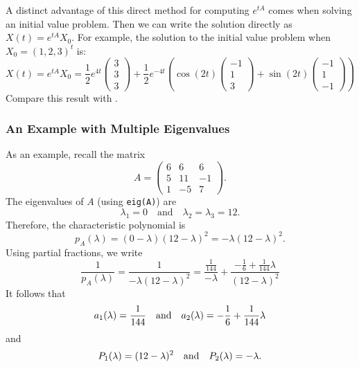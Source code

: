 \documentclass{ximera}
\begin{document}
A distinct advantage of this direct method for computing $e^{tA}$ comes
when solving an initial value problem.  Then we can write the solution 
directly as $X(t)=e^{tA}X_0$.  For example, the solution to the initial
value problem when $X_0=(1,2,3)^t$ is:
\[
X(t) = e^{tA}X_0 = \frac{1}{2}e^{4t}
\left(\begin{array}{c} 3\\3\\3\end{array}\right)
+ \frac{1}{2}e^{-4t}\left(\cos(2t)\left(\begin{array}{r}
-1\\1\\3\end{array}\right)+\sin(2t)
\left(\begin{array}{r} -1\\1\\-1 \end{array}\right)\right) 
\]
Compare this result with .


\subsubsection*{An Example with Multiple Eigenvalues}

As an example, recall the matrix 
\[
A =
\left(\begin{array}{rrr}
     6  &  6  &  6\\
     5  & 11  & -1\\
     1  & -5  &  7
\end{array}\right).
\]
The eigenvalues of $A$ (using {\tt eig(A)}) are
\[
\lambda_1=0\quad \mbox{and}\quad \lambda_2=\lambda_3=12.
\]
Therefore, the characteristic polynomial is
\[
p_A(\lambda) = (0-\lambda)(12-\lambda)^2=-\lambda(12-\lambda)^2.
\]
Using partial fractions, we write
\[
\frac{1}{p_A(\lambda)} = \frac{1}{-\lambda(12-\lambda)^2}=
\frac{\frac{1}{144}}{-\lambda} + 
\frac{-\frac{1}{6}+\frac{1}{144}\lambda}{(12-\lambda)^2}
\]
It follows that 
\[
a_1(\lambda)=\frac{1}{144} \quad\mbox{and}\quad a_2(\lambda) = -\frac{1}{6}+\frac{1}{144}\lambda
\]
and
\[
P_1(\lambda)=(12-\lambda)^2 \quad\mbox{and}\quad P_2(\lambda) = -\lambda.
\]
\end{document}
